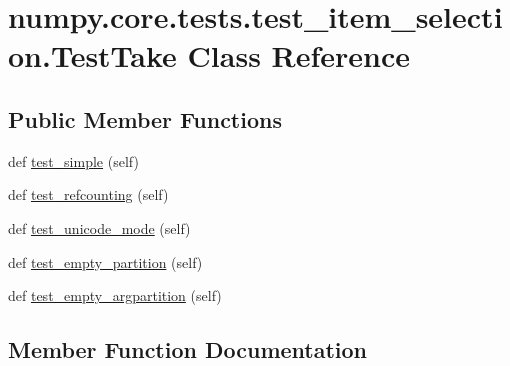 \hypertarget{classnumpy_1_1core_1_1tests_1_1test__item__selection_1_1TestTake}{}\section{numpy.\+core.\+tests.\+test\+\_\+item\+\_\+selection.\+Test\+Take Class Reference}
\label{classnumpy_1_1core_1_1tests_1_1test__item__selection_1_1TestTake}
\subsection*{Public Member Functions}
\begin{DoxyCompactItemize}
\item 
def \hyperlink{classnumpy_1_1core_1_1tests_1_1test__item__selection_1_1TestTake_a979aaf3427bfcf8dd1b002be799b8bcf}{test\+\_\+simple} (self)
\item 
def \hyperlink{classnumpy_1_1core_1_1tests_1_1test__item__selection_1_1TestTake_a84dd88d55ab9ed2383c2971a15bd7924}{test\+\_\+refcounting} (self)
\item 
def \hyperlink{classnumpy_1_1core_1_1tests_1_1test__item__selection_1_1TestTake_a347b66cdc182bd2609465ccb31b659fe}{test\+\_\+unicode\+\_\+mode} (self)
\item 
def \hyperlink{classnumpy_1_1core_1_1tests_1_1test__item__selection_1_1TestTake_af8e4d4f59c63a20b367bb64bdceafe21}{test\+\_\+empty\+\_\+partition} (self)
\item 
def \hyperlink{classnumpy_1_1core_1_1tests_1_1test__item__selection_1_1TestTake_ad3e881f7964b4ee24e2a06582ffaffd9}{test\+\_\+empty\+\_\+argpartition} (self)
\end{DoxyCompactItemize}


\subsection{Member Function Documentation}
\mbox{\label{classnumpy_1_1core_1_1tests_1_1test__item__selection_1_1TestTake_ad3e881f7964b4ee24e2a06582ffaffd9}} 

